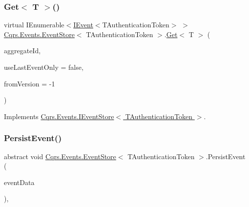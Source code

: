 \subsubsection{\texorpdfstring{Get$<$ T $>$()}{Get< T >()}}
{\footnotesize\ttfamily virtual I\+Enumerable$<$\hyperlink{interfaceCqrs_1_1Events_1_1IEvent}{I\+Event}$<$T\+Authentication\+Token$>$ $>$ \hyperlink{classCqrs_1_1Events_1_1EventStore}{Cqrs.\+Events.\+Event\+Store}$<$ T\+Authentication\+Token $>$.\hyperlink{classCqrs_1_1Events_1_1EventStore_aa1d0d399a35c1e3b0759e27202695d8b_aa1d0d399a35c1e3b0759e27202695d8b}{Get}$<$ T $>$ (\begin{DoxyParamCaption}\item[{Guid}]{aggregate\+Id,  }\item[{bool}]{use\+Last\+Event\+Only = {\ttfamily false},  }\item[{int}]{from\+Version = {\ttfamily -\/1} }\end{DoxyParamCaption})\hspace{0.3cm}{\ttfamily [virtual]}}



Implements \hyperlink{interfaceCqrs_1_1Events_1_1IEventStore_add6227e2978ff8656aad79b1a51bf34c_add6227e2978ff8656aad79b1a51bf34c}{Cqrs.\+Events.\+I\+Event\+Store$<$ T\+Authentication\+Token $>$}.

\mbox{\label{classCqrs_1_1Events_1_1EventStore_aedb71ca0ddf21220e323bc60ad7508cd_aedb71ca0ddf21220e323bc60ad7508cd}} 
\subsubsection{\texorpdfstring{Persist\+Event()}{PersistEvent()}}
{\footnotesize\ttfamily abstract void \hyperlink{classCqrs_1_1Events_1_1EventStore}{Cqrs.\+Events.\+Event\+Store}$<$ T\+Authentication\+Token $>$.Persist\+Event (\begin{DoxyParamCaption}\item[{\hyperlink{classCqrs_1_1Events_1_1EventData}{Event\+Data}}]{event\+Data }\end{DoxyParamCaption})\hspace{0.3cm}{\ttfamily [protected]}, {}}



